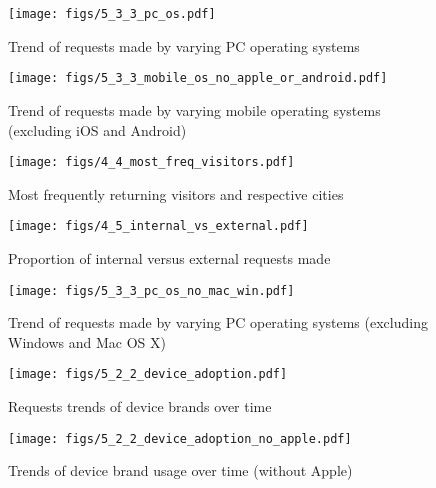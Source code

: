 \documentclass[12pt,titlepage]{article}
\begin{document}
\begin{figure}[thbp]
  \centering
  \texttt{[image: figs/5\_3\_3\_pc\_os.pdf]}
  \caption{Trend of requests made by varying PC operating systems}
  \label{fig:5_3_3_pc_os}
\end{figure}

\begin{figure}[thbp]
  \centering
  \texttt{[image: figs/5\_3\_3\_mobile\_os\_no\_apple\_or\_android.pdf]}
  \caption{Trend of requests made by varying mobile operating systems (excluding iOS and Android)}
  \label{fig:5_3_3_mobile_os_no_apple_or_android}
\end{figure}

\begin{figure}[thbp]
  \centering
  \texttt{[image: figs/4\_4\_most\_freq\_visitors.pdf]}
  \caption{Most frequently returning visitors and respective cities}
  \label{fig:4_4_most_freq_visitors}
\end{figure}

\begin{figure}[thbp]
  \centering
  \texttt{[image: figs/4\_5\_internal\_vs\_external.pdf]}
  \caption{Proportion of internal versus external requests made}
  \label{fig:4_5_internal_vs_external}
\end{figure}

\begin{figure}[thbp]
  \centering
  \texttt{[image: figs/5\_3\_3\_pc\_os\_no\_mac\_win.pdf]}
  \caption{Trend of requests made by varying PC operating systems (excluding Windows and Mac OS X)}
  \label{fig:5_3_3_pc_os_no_mac_win}
\end{figure}





\begin{figure}[thbp]
  \centering
  \texttt{[image: figs/5\_2\_2\_device\_adoption.pdf]}
  \caption{Requests trends of device brands over time}
  \label{fig:5_2_2_device_adoption}
\end{figure}

\begin{figure}[thbp]
  \centering
  \texttt{[image: figs/5\_2\_2\_device\_adoption\_no\_apple.pdf]}
  \caption{Trends of device brand usage over time (without Apple)}
  \label{fig:5_2_2_device_adoption_no_apple}
\end{figure}
\end{document}
